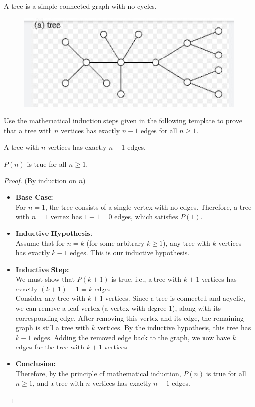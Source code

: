 \documentclass[12pt]{article}
\newcommand{\vs}{\vspace{2mm}}
\newcommand{\ls}{\vspace{5mm}}
\begin{document}

A tree is a simple connected graph with no cycles.

\begin{figure}[!h]
\centering
\includegraphics[scale=1]{TreeExample.jpg}
\caption{}
\label{fig1}
\end{figure}

Use the mathematical induction steps given in the following template to prove that a tree with $n$ vertices has exactly $n-1$ edges for all $n \geq 1$.

\vs


 A tree with $n$ vertices has exactly $n-1$ edges.
\ls

 $P(n)$ is true for all $n \geq 1$.

\vs
\begin{proof} (By induction on $n$)
    \begin{itemize}
    \item \textbf{Base Case:} \\
    For $n = 1$, the tree consists of a single vertex with no edges. Therefore, a tree with $n = 1$ vertex has $1-1 = 0$ edges, which satisfies $P(1)$.

    \item \textbf{Inductive Hypothesis:} \\
    Assume that for $n = k$ (for some arbitrary $k \geq 1$), any tree with $k$ vertices has exactly $k-1$ edges. This is our inductive hypothesis.
    
    \item \textbf{Inductive Step:} \\
    We must show that $P(k+1)$ is true, i.e., a tree with $k+1$ vertices has exactly $(k+1) - 1 = k$ edges. \\
    Consider any tree with $k+1$ vertices. Since a tree is connected and acyclic, we can remove a leaf vertex (a vertex with degree 1), along with its corresponding edge. After removing this vertex and its edge, the remaining graph is still a tree with $k$ vertices. By the inductive hypothesis, this tree has $k-1$ edges. Adding the removed edge back to the graph, we now have $k$ edges for the tree with $k+1$ vertices.

    \item \textbf{Conclusion:} \\
    Therefore, by the principle of mathematical induction, $P(n)$ is true for all $n \geq 1$, and a tree with $n$ vertices has exactly $n-1$ edges.
    \end{itemize}
\end{proof}
\end{document}
